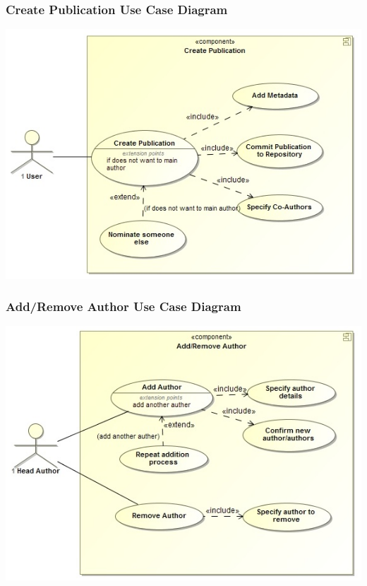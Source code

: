 \documentclass[a4paper,12pt]{article}
\begin{document}
	\subsubsection{Create Publication Use Case Diagram}
	\includegraphics[width=1\textwidth]{./CreatePublication.jpg}\\[1.5cm]

	\subsubsection{Add/Remove Author Use Case Diagram}
	\includegraphics[width=1\textwidth]{./AddRemoveAuthor.jpg}\\[1.5cm]
\end{document}
